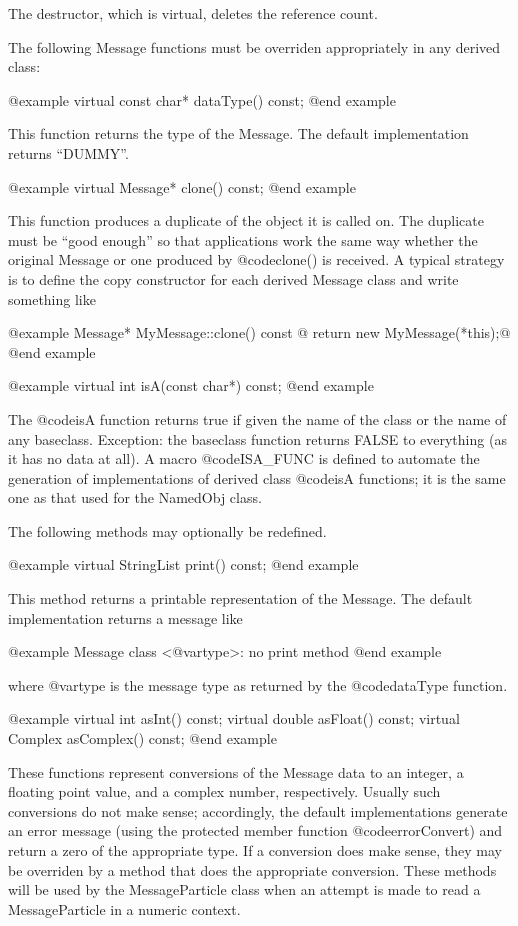 The destructor, which is virtual, deletes the reference count.

The following Message functions must be overriden appropriately in any
derived class:

@example
virtual const char* dataType() const;
@end example

This function returns the type of the Message.  The default
implementation returns ``DUMMY''.

@example
virtual Message* clone() const;
@end example

This function produces a duplicate of the object it is called on.
The duplicate must be ``good enough'' so that applications work the
same way whether the original Message or one produced by @code{clone()}
is received.  A typical strategy is to define the copy constructor
for each derived Message class and write something like

@example
Message* MyMessage::clone() const @{ return new MyMessage(*this);@}
@end example

@example
virtual int isA(const char*) const;
@end example

The @code{isA} function returns true if given the name of the class
or the name of any baseclass.  Exception: the baseclass function returns
FALSE to everything (as it has no data at all).  A macro @code{ISA_FUNC}
is defined to automate the generation of implementations of derived
class @code{isA} functions; it is the same one as that used for the
NamedObj class.

The following methods may optionally be redefined.

@example
virtual StringList print() const;
@end example

This method returns a printable representation of the Message.
The default implementation returns a message like

@example
Message class <@var{type}>: no print method
@end example

where @var{type} is the message type as returned by the @code{dataType}
function.

@example
virtual int asInt() const;
virtual double asFloat() const;
virtual Complex asComplex() const;
@end example

These functions represent conversions of the Message data to an integer,
a floating point value, and a complex number, respectively.  Usually
such conversions do not make sense; accordingly, the default
implementations generate an error message (using the protected member
function @code{errorConvert}) and return a zero of the appropriate type.
If a conversion does make sense, they may be overriden by a method that
does the appropriate conversion.  These methods will be used by the
MessageParticle class when an attempt is made to read a MessageParticle
in a numeric context.

